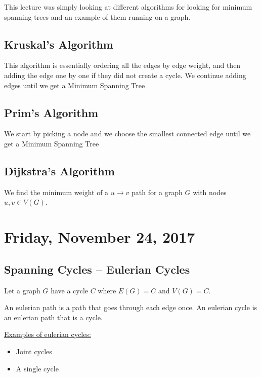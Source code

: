 \documentclass[12pt]{article}
\begin{document}
This lecture was simply looking at different algorithms for looking for minimum spanning trees and an example of them running on a graph.

\subsection{Kruskal's Algorithm}

This algorithm is essentially ordering all the edges by edge weight, and then adding the edge one by one if they did not create a cycle. We continue adding edges until we get a Minimum Spanning Tree 

\subsection{Prim's Algorithm}

We start by picking a node and we choose the smallest connected edge until we get a Minimum Spanning Tree

\subsection{Dijkstra's Algorithm}

We find the minimum weight of a $u\rightarrow v$ path for a graph $G$ with nodes $u,v \in V(G)$.

\newpage

\section{Friday, November 24, 2017}

\subsection{Spanning Cycles -- Eulerian Cycles}

Let a graph $G$ have a cycle $C$ where $E(G) = C$ and $V(G) = C$.

\begin{tcolorbox}[title=Definition: Eulerian Path \slash  Cycle]
	An eulerian path is a path that goes through each edge once. An eulerian cycle is an eulerian path that is a cycle.
\end{tcolorbox}

\underline{Examples of eulerian cycles:}
\begin{itemize}
	\item{Joint cycles}
	\item{A single cycle}
\end{itemize}
\end{document}
